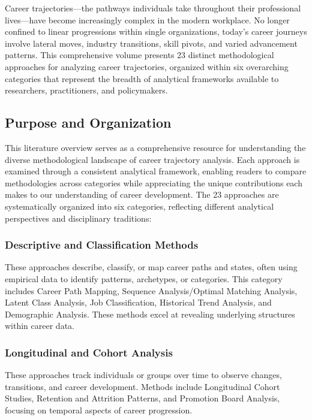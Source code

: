 \documentclass[./main.tex]{subfiles}
\begin{document}
Career trajectories---the pathways individuals take throughout their
professional lives---have become increasingly complex in the modern
workplace. No longer confined to linear progressions within single
organizations, today's career journeys involve lateral moves, industry
transitions, skill pivots, and varied advancement patterns. This
comprehensive volume presents 23 distinct methodological approaches for
analyzing career trajectories, organized within six overarching
categories that represent the breadth of analytical frameworks available
to researchers, practitioners, and policymakers.

\subsection{Purpose and Organization}\label{purpose-and-organization}

This literature overview serves as a comprehensive resource for
understanding the diverse methodological landscape of career trajectory
analysis. Each approach is examined through a consistent analytical
framework, enabling readers to compare methodologies across categories
while appreciating the unique contributions each makes to our
understanding of career development. The 23 approaches are
systematically organized into six categories, reflecting different
analytical perspectives and disciplinary traditions:

\subsubsection{Descriptive and Classification
Methods}\label{descriptive-and-classification-methods}

These approaches describe, classify, or map career paths and states,
often using empirical data to identify patterns, archetypes, or
categories. This category includes Career Path Mapping, Sequence
Analysis/Optimal Matching Analysis, Latent Class Analysis, Job
Classification, Historical Trend Analysis, and Demographic Analysis.
These methods excel at revealing underlying structures within career
data.

\subsubsection{Longitudinal and Cohort
Analysis}\label{longitudinal-and-cohort-analysis}

These approaches track individuals or groups over time to observe
changes, transitions, and career development. Methods include
Longitudinal Cohort Studies, Retention and Attrition Patterns, and
Promotion Board Analysis, focusing on temporal aspects of career
progression.
\end{document}
